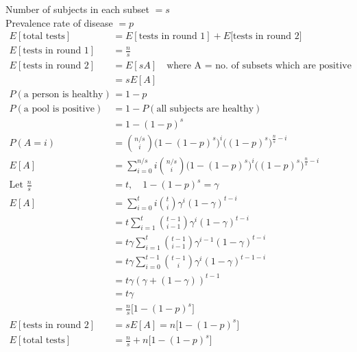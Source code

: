 \documentclass[12pt]{article}
\begin{document}
Number of subjects in each subset $= s$ \\

Prevalence rate of disease $= p$ \\[1em]

\begin{align*}
E[\text{total tests}] &= E[\text{tests in round 1}] + E[\text{tests in round 2]} \\
E[\text{tests in round 1}] &= \frac{n}{s} \\
E[\text{tests in round 2}] &= E[sA] \quad \text{where A = no. of subsets which are positive} \\
&= sE[A] \\
P(\text{a person is healthy}) &= 1-p \\
P(\text{a pool is positive}) &= 1-P(\text{all subjects are healthy}) \\
&= 1-(1-p)^s \\
P(A=i) &= \binom{n/s}{i}\Big(1-(1-p)^s\Big)^i \Big((1-p)^s\Big)^{\tfrac{n}{s}-i} \\
E[A] &= \sum_{i=0}^{n/s} i \binom{n/s}{i}\Big(1-(1-p)^s\Big)^i \Big((1-p)^s\Big)^{\tfrac{n}{s}-i} \\
\text{Let } \frac{n}{s} &= t, \quad 1-(1-p)^s = \gamma \\
E[A] &= \sum_{i=0}^t i \binom{t}{i} \gamma^i (1-\gamma)^{t-i} \\
&= t \sum_{i=1}^t \binom{t-1}{i-1} \gamma^{i} (1-\gamma)^{t-i} \\
&= t\gamma \sum_{i=1}^t \binom{t-1}{i-1} \gamma^{i-1}(1-\gamma)^{t-i} \\
&= t\gamma \sum_{i=0}^{t-1} \binom{t-1}{i} \gamma^{i}(1-\gamma)^{t-1-i} \\
&= t\gamma ( \gamma + (1-\gamma))^{t-1} \\
&= t\gamma \\
&= \frac{n}{s}\Big[1-(1-p)^s\Big] \\
E[\text{tests in round 2}] &= sE[A] = n\Big[1-(1-p)^s\Big] \\
E[\text{total tests}] &= \frac{n}{s} + n\Big[1-(1-p)^s\Big]
\end{align*}
\end{document}
